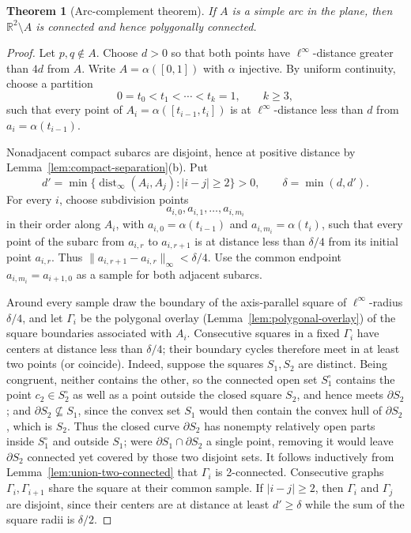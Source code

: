 \documentclass[11pt]{article}
\theoremstyle{mainplain}
\newtheorem{theorem}{Theorem}[section]
\theoremstyle{mainroman}
\theoremstyle{definition}
\numberwithin{equation}{section}
\begin{document}
\begin{theorem}[Arc-complement theorem]\label{thm:arc-complement}
If $A$ is a simple arc in the plane, then
$\mathbb R^2\setminus A$ is connected and hence polygonally connected.
\end{theorem}
\begin{proof}
Let $p,q\notin A$. Choose $d>0$ so that both points have
$\ell^\infty$-distance greater than $4d$ from $A$. Write
$A=\alpha([0,1])$ with $\alpha$ injective. By uniform continuity,
choose a partition
\[
0=t_0<t_1<\cdots<t_k=1,\qquad k\geq3,
\]
such that every point of
$A_i=\alpha([t_{i-1},t_i])$ is at $\ell^\infty$-distance less than
$d$ from $a_i=\alpha(t_{i-1})$.

Nonadjacent compact subarcs are disjoint, hence at positive distance
by Lemma~\ref{lem:compact-separation}\textup{(b)}. Put
\[
 d'=
 \min\{\operatorname{dist}_\infty(A_i,A_j):|i-j|\geq2\}>0,
 \qquad
 \delta=\min(d,d').
\]
For every $i$, choose subdivision points
\[
 a_{i,0},a_{i,1},\ldots,a_{i,m_i}
\]
in their order along $A_i$, with $a_{i,0}=\alpha(t_{i-1})$ and
$a_{i,m_i}=\alpha(t_i)$, such that every point of the subarc from
$a_{i,r}$ to $a_{i,r+1}$ is at distance less than $\delta/4$ from its
initial point $a_{i,r}$. Thus
$\|a_{i,r+1}-a_{i,r}\|_\infty<\delta/4$. Use the common endpoint
$a_{i,m_i}=a_{i+1,0}$ as a sample for both adjacent subarcs.

Around every sample draw the boundary of the axis-parallel square of
$\ell^\infty$-radius $\delta/4$, and let $\Gamma_i$ be the polygonal
overlay (Lemma~\ref{lem:polygonal-overlay}) of the square boundaries
associated with $A_i$. Consecutive
squares in a fixed $\Gamma_i$ have centers at distance less than
$\delta/4$; their boundary cycles therefore meet in at least two
points (or coincide). Indeed, suppose the squares $S_1,S_2$ are
distinct. Being congruent, neither contains the other, so the
connected open set $S_1^\circ$ contains the point $c_2\in S_2^\circ$
as well as a point outside the closed square $S_2$, and hence meets
$\partial S_2$; and $\partial S_2\not\subseteq S_1$, since the convex
set $S_1$ would then contain the convex hull of $\partial S_2$, which
is $S_2$. Thus the closed curve $\partial S_2$ has nonempty relatively
open parts inside $S_1^\circ$ and outside $S_1$; were
$\partial S_1\cap\partial S_2$ a single point, removing it would leave
$\partial S_2$ connected yet covered by those two disjoint sets. It follows inductively from
Lemma~\ref{lem:union-two-connected} that $\Gamma_i$ is 2-connected.
Consecutive graphs $\Gamma_i,\Gamma_{i+1}$ share the square at their
common sample. If $|i-j|\geq2$, then $\Gamma_i$ and $\Gamma_j$ are
disjoint, since their centers are at distance at least $d'\geq\delta$
while the sum of the square radii is $\delta/2$.


\end{proof}
\end{document}
